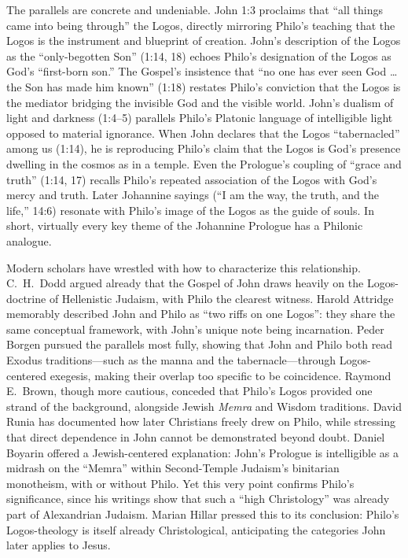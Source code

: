 The parallels are concrete and undeniable.
John 1:3 proclaims that “all things came into being through” the Logos, directly mirroring Philo’s teaching that the Logos is the instrument and blueprint of creation.
John’s description of the Logos as the “only-begotten Son” (1:14, 18) echoes Philo’s designation of the Logos as God’s “first-born son.”
The Gospel’s insistence that “no one has ever seen God … the Son has made him known” (1:18) restates Philo’s conviction that the Logos is the mediator bridging the invisible God and the visible world.
John’s dualism of light and darkness (1:4–5) parallels Philo’s Platonic language of intelligible light opposed to material ignorance.
When John declares that the Logos “tabernacled” among us (1:14), he is reproducing Philo’s claim that the Logos is God’s presence dwelling in the cosmos as in a temple.
Even the Prologue’s coupling of “grace and truth” (1:14, 17) recalls Philo’s repeated association of the Logos with God’s mercy and truth.
Later Johannine sayings (“I am the way, the truth, and the life,” 14:6) resonate with Philo’s image of the Logos as the guide of souls.
In short, virtually every key theme of the Johannine Prologue has a Philonic analogue.

Modern scholars have wrestled with how to characterize this relationship.
C.~H.~Dodd argued already that the Gospel of John draws heavily on the Logos-doctrine of Hellenistic Judaism, with Philo the clearest witness.
Harold Attridge memorably described John and Philo as “two riffs on one Logos”: they share the same conceptual framework, with John’s unique note being incarnation.
Peder Borgen pursued the parallels most fully, showing that John and Philo both read Exodus traditions—such as the manna and the tabernacle—through Logos-centered exegesis, making their overlap too specific to be coincidence.
Raymond E.~Brown, though more cautious, conceded that Philo’s Logos provided one strand of the background, alongside Jewish \emph{Memra} and Wisdom traditions.
David Runia has documented how later Christians freely drew on Philo, while stressing that direct dependence in John cannot be demonstrated beyond doubt.
Daniel Boyarin offered a Jewish-centered explanation: John’s Prologue is intelligible as a midrash on the “Memra” within Second-Temple Judaism’s binitarian monotheism, with or without Philo.
Yet this very point confirms Philo’s significance, since his writings show that such a “high Christology” was already part of Alexandrian Judaism.
Marian Hillar pressed this to its conclusion: Philo’s Logos-theology is itself already Christological, anticipating the categories John later applies to Jesus.

